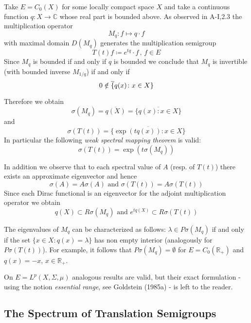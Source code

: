 Take $E = C_{0}(X)$ for some locally compact space $X$ and take a continuous function $q \colon X \to \mathbb{C}$ whose real part is bounded above.
As observed in A-I,2.3 the multiplication operator
\[
M_{q} \colon f \mapsto q \cdot f
\]
with maximal domain $D(M_{q})$ generates the multiplication semigroup
\[
T(t)f \coloneqq e^{tq} \cdot f \, , \, f \in E
\]
Since $M_{q}$ is bounded if and only if $q$ is bounded we conclude that $M_{q}$ is invertible (with bounded inverse $M_{1/q}$) if and only if
\[
0 \notin \overline\{{q(x)  \colon x \in X\}}
\]

Therefore we obtain
\[
\sigma(M_{q}) = \overline{q(X)} = \overline{\{q(x) \colon x \in X\}}
\]
and
\[
\sigma(T(t)) = \overline{\{\exp(tq(x)) \colon x \in X\}}
\]
In particular the following \emph{weak spectral mapping theorem} is valid:
\[
\sigma(T(t)) = \exp(t\sigma(M_{q}))
\]

In addition we observe that to each spectral value of $A$ (resp. of $T(t)$) there exists an approximate eigenvector and hence
\[
\sigma(A) = A\sigma(A) \text{ and } \sigma(T(t)) = A\sigma(T(t))
\]
Since each Dirac functional is an eigenvector for the adjoint multiplication operator we obtain
\[
q(X) \subset R\sigma(M_{q}) \text{ and } e^{tq(X)} \subset R\sigma(T(t))
\]


\newpage
The eigenvalues of $M_{q}$ can be characterized as follows:
\newline
$\lambda \in P\sigma(M_{q})$ if and only if the set $\{x \in X \colon q(x) = \lambda\}$ has non empty interior (analogously for $P\sigma(T(t))$).
For example, it follows that $P\sigma(M_{q}) = \emptyset$ for $E = C_{0}(\mathbb{R}_{+})$ and $q(x) = -x$, $x \in \mathbb{R}_{+}$.

On $E = L^{p}(X,\Sigma,\mu)$ analogous results are valid, but their exact formulation - using the notion \emph{essential range}, see Goldstein (1985a) - is left to the reader.

\subsection{The Spectrum of Translation Semigroups}\label{subsec:a3-2.4}


